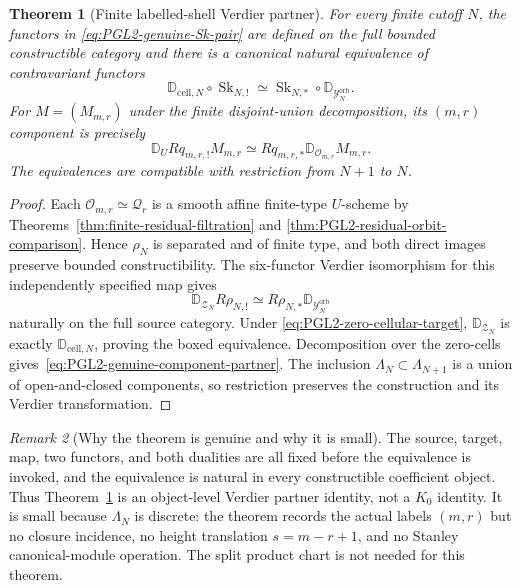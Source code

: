 \documentclass[11pt]{article}
\newtheorem{theorem}{Theorem}[section]
\theoremstyle{definition}
\theoremstyle{remark}
\newtheorem{remark}[theorem]{Remark}
\newcommand{\D}{\mathbb D}
\newcommand{\Sk}{\operatorname{Sk}}
\begin{document}
\begin{theorem}[Finite labelled-shell Verdier partner]
\label{thm:PGL2-genuine-small-skeletonization}
For every finite cutoff $N$, the functors in
\eqref{eq:PGL2-genuine-Sk-pair} are defined on the full bounded constructible
category and there is a canonical natural equivalence of contravariant
functors
\begin{equation}
 \boxed{
 \D_{\mathrm{cell},N}\circ\Sk_{N,!}
 \simeq
 \Sk_{N,*}\circ\D_{\mathscr Y_N^{\mathrm{orb}}}.}
 \label{eq:PGL2-genuine-small-skeletonization}
\end{equation}
For $M=(M_{m,r})$ under the finite disjoint-union decomposition, its
$(m,r)$ component is precisely
\begin{equation}
 \D_U Rq_{m,r,!}M_{m,r}
 \simeq
 Rq_{m,r,*}\D_{\mathscr O_{m,r}}M_{m,r}.
 \label{eq:PGL2-genuine-component-partner}
\end{equation}
The equivalences are compatible with restriction from $N+1$ to $N$.
\end{theorem}

\begin{proof}
Each $\mathscr O_{m,r}\simeq\mathscr Q_r$ is a smooth affine finite-type
$U$-scheme by Theorems~\ref{thm:finite-residual-filtration} and
\ref{thm:PGL2-residual-orbit-comparison}.  Hence $\rho_N$ is separated and of
finite type, and both direct images preserve bounded constructibility.  The
six-functor Verdier isomorphism for this independently specified map gives
\[
 \D_{\mathscr Z_N}R\rho_{N,!}
 \simeq
 R\rho_{N,*}\D_{\mathscr Y_N^{\mathrm{orb}}}
\]
naturally on the full source category.  Under
\eqref{eq:PGL2-zero-cellular-target}, $\D_{\mathscr Z_N}$ is exactly
$\D_{\mathrm{cell},N}$, proving the boxed equivalence.  Decomposition over the
zero-cells gives~\eqref{eq:PGL2-genuine-component-partner}.  The inclusion
$\Lambda_N\subset\Lambda_{N+1}$ is a union of open-and-closed components, so
restriction preserves the construction and its Verdier transformation.
\end{proof}

\begin{remark}[Why the theorem is genuine and why it is small]
The source, target, map, two functors, and both dualities are all fixed before
the equivalence is invoked, and the equivalence is natural in every
constructible coefficient object.  Thus
Theorem~\ref{thm:PGL2-genuine-small-skeletonization} is an object-level
Verdier partner identity, not a $K_0$ identity.  It is small because
$\Lambda_N$ is discrete: the theorem records the actual labels $(m,r)$ but no
closure incidence, no height translation $s=m-r+1$, and no Stanley
canonical-module operation.  The split product chart is not needed for this
theorem.
\end{remark}
\end{document}
